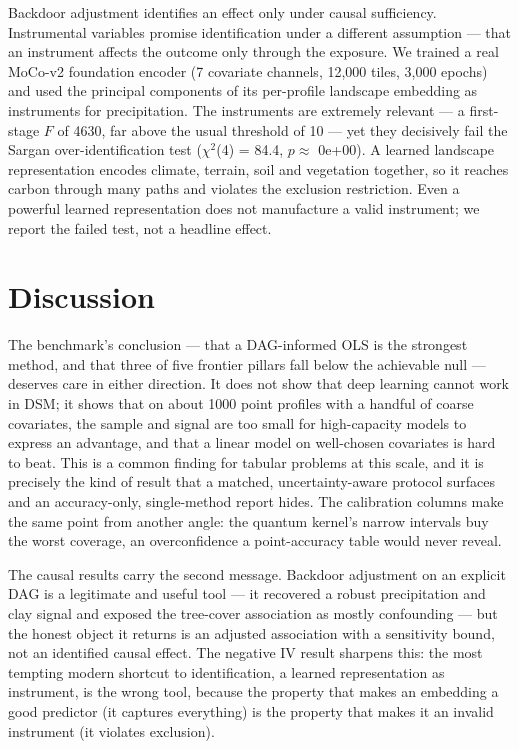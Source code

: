 \documentclass[10pt,letterpaper]{article}
\begin{document}
Backdoor adjustment identifies an effect only under causal sufficiency.
Instrumental variables promise identification under a different
assumption --- that an instrument affects the outcome only through the
exposure. We trained a real MoCo-v2 foundation encoder (7 covariate
channels, 12,000 tiles, 3,000 epochs) and used the principal components
of its per-profile landscape embedding as instruments for precipitation.
The instruments are extremely relevant --- a first-stage \(F\) of 4630,
far above the usual threshold of 10 --- yet they decisively fail the
Sargan over-identification test (\(\chi^2\)(4) = 84.4, \(p \approx\)
0e+00). A learned landscape representation encodes climate, terrain,
soil and vegetation together, so it reaches carbon through many paths
and violates the exclusion restriction. Even a powerful learned
representation does not manufacture a valid instrument; we report the
failed test, not a headline effect.

\section{Discussion}\label{discussion}

The benchmark's conclusion --- that a DAG-informed OLS is the strongest
method, and that three of five frontier pillars fall below the
achievable null --- deserves care in either direction. It does not show
that deep learning cannot work in DSM; it shows that on about 1000 point
profiles with a handful of coarse covariates, the sample and signal are
too small for high-capacity models to express an advantage, and that a
linear model on well-chosen covariates is hard to beat. This is a common
finding for tabular problems at this scale, and it is precisely the kind
of result that a matched, uncertainty-aware protocol surfaces and an
accuracy-only, single-method report hides. The calibration columns make
the same point from another angle: the quantum kernel's narrow intervals
buy the worst coverage, an overconfidence a point-accuracy table would
never reveal.

The causal results carry the second message. Backdoor adjustment on an
explicit DAG is a legitimate and useful tool --- it recovered a robust
precipitation and clay signal and exposed the tree-cover association as
mostly confounding --- but the honest object it returns is an adjusted
association with a sensitivity bound, not an identified causal effect.
The negative IV result sharpens this: the most tempting modern shortcut
to identification, a learned representation as instrument, is the wrong
tool, because the property that makes an embedding a good predictor (it
captures everything) is the property that makes it an invalid instrument
(it violates exclusion).
\end{document}
